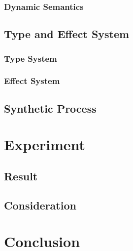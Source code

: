 \documentclass[12pt, a4paper, titlepage]{report}
\begin{document}
    \subsection{Dynamic Semantics} %
  \section{Type and Effect System}
    \cite{pierce:2002}
    \subsection{Type System}
    \subsection{Effect System}
  \section{Synthetic Process}

\chapter{Experiment}\label{section:experiment}
\section{Result}
\section{Consideration}

\chapter{Conclusion}\label{section:conclusion}



\end{document}
